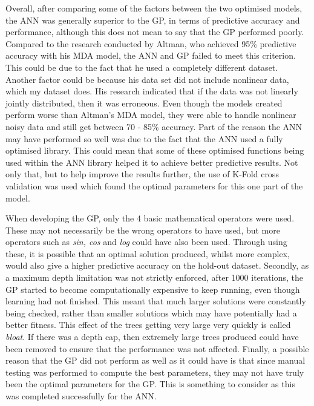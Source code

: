 \documentclass[11pt]{article}
\begin{document}
Overall, after comparing some of the factors between the two optimised models, the ANN was generally superior to the GP, in terms of predictive accuracy and performance, although this does not mean to say that the GP performed poorly. Compared to the research conducted by Altman, who achieved 95\% predictive accuracy with his MDA model, the ANN and GP failed to meet this criterion. This could be due to the fact that he used a completely different dataset. Another factor could be because his data set did not include nonlinear data, which my dataset does. His research indicated that if the data was not linearly jointly distributed, then it was erroneous. Even though the models created perform worse than Altman's MDA model, they were able to handle nonlinear noisy data and still get between 70 - 85\% accuracy. 
Part of the reason the ANN may have performed so well was due to the fact that the ANN used a fully optimised library. This could mean that some of these optimised functions being used within the ANN library helped it to achieve better predictive results. 
Not only that, but to help improve the results further, the use of K-Fold cross validation was used which found the optimal parameters for this one part of the model. 

When developing  the GP, only the 4 basic mathematical operators were used. These may not necessarily be the wrong operators to have used, but more operators such as \textit{sin, cos} and \textit{log} could have also been used. Through using these, it is possible that an optimal solution produced, whilst more complex, would also give a higher predictive accuracy on the hold-out dataset.  Secondly, as a maximum depth limitation was not strictly enforced, after 1000 iterations, the GP started to become computationally expensive to keep running, even though learning had not finished. This meant that much larger solutions were constantly being checked, rather than smaller solutions which may have potentially had a better fitness. This effect of the trees getting very large very quickly is called \textit{bloat}. If there was a depth cap, then extremely large trees produced could have been removed to ensure that the performance was not affected. Finally, a possible reason that the GP did not perform as well as it could have is that since manual testing was performed to compute the best parameters, they may not have truly been the optimal parameters for the GP. This is something to consider as this was completed successfully for the ANN. \\
\end{document}
